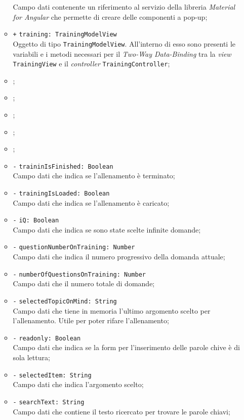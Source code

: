 \begin{itemize}
\begin{itemize}
		Campo dati contenente un riferimento al servizio della libreria \textit{Material for Angular} che permette di creare delle componenti a pop-up;
		\item \texttt{+} \texttt{training: TrainingModelView} \\
		Oggetto di tipo \texttt{TrainingModelView}. All'interno di esso sono presenti le variabili e i metodi necessari per il \textit{Two-Way Data-Binding} tra la \textit{view} \texttt{TrainingView} e il \textit{controller} \texttt{TrainingController};
		\item \timeoutA;
		\item \locationA;
		\item \routeparamsA;
		\item \errorinfomodelA;
		\item \questionsserviceA;
		\item \texttt{-} \texttt{traininIsFinished: Boolean} \\Campo dati che indica se l'allenamento è terminato;
		\item \texttt{-} \texttt{trainingIsLoaded: Boolean} \\Campo dati che indica se l'allenamento è caricato;
		\item \texttt{-} \texttt{iQ: Boolean} \\Campo dati che indica se sono state scelte infinite domande;
		\item \texttt{-} \texttt{questionNumberOnTraining: Number} \\Campo dati che indica il numero progressivo della domanda attuale;
		\item \texttt{-} \texttt{numberOfQuestionsOnTraining: Number} \\Campo dati che il numero totale di domande;
		\item \texttt{-} \texttt{selectedTopicOnMind: String} \\Campo dati che tiene in memoria l'ultimo argomento scelto per l'allenamento. Utile per poter rifare l'allenamento;
		\item \texttt{-} \texttt{readonly: Boolean} \\Campo dati che indica se la form per l'inserimento delle parole chive è di sola lettura;
		\item \texttt{-} \texttt{selectedItem: String} \\Campo dati che indica l'argomento scelto;
		\item \texttt{-} \texttt{searchText: String} \\Campo dati che contiene il testo ricercato per trovare le parole chiavi;

\end{itemize}
\end{itemize}
